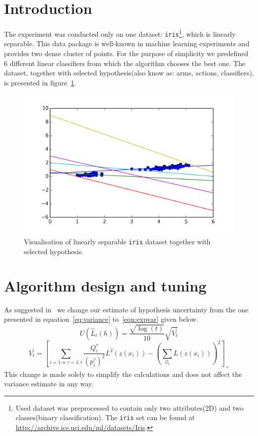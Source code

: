 \documentclass[12pt, a4paper, pdflatex, leqno, twoside]{report}
\begin{document}
\section{Introduction}
The experiment was conducted only on one dataset: \texttt{iris}\footnote{Used 
dataset was preprocessed to contain only two attributes(2D) and two 
classes(binary classification). The \texttt{iris} set can be found at 
\url{http://archive.ics.uci.edu/ml/datasets/Iris}.}, which is linearly 
separable. This data package is well-known in machine learning experiments and 
provides two dense cluster of points. For the purpose of simplicity we 
predefined 6 different linear classifiers from which the algorithm chooses the 
best one. The dataset, together with selected hypothesis(also know as: arms, actions, classifiers), is presented in 
figure~\ref{fig:hyp}.\\

\begin{figure}[htbp]
  \centering
  \includegraphics[width=0.7\linewidth]{graphics/gypothesis.png}
  \begin{tiny}
    \caption{Visualisation of linearly separable \texttt{iris} dataset together 
with selected hypothesis.\label{fig:hyp}}
  \end{tiny}
  \vspace{1cm}
\end{figure}

\section{Algorithm design and tuning}
As suggested in~\citep{DBLP:journals/corr/GantiG13} we change our estimate of 
hypothesis uncertainty from the one presented in equation~\ref{eq:variance} 
to~\ref{eqn:expvar} given below.\\
\begin{equation}
\label{eqn:expvar}
U(\hat{L}_t(h)) = \frac{ \sqrt{ \log(t) } }
                       { 10 }
                  \sqrt{ V^\prime_t }
\end{equation}
$$
V^\prime_t = \left[
  \sum_{i = 1:n \text{~} \tau = 1:t} \frac{Q^\tau_i}{(p^\tau_i)^2} L^2(z(x_i))
  -
  \left( \sum_{\mathscr{Q}_t} L(z(x_i)) \right)^2
\right]_+
$$
This change is made solely to simplify the calculations and does not affect the variance 
estimate in any way.\\
\end{document}
